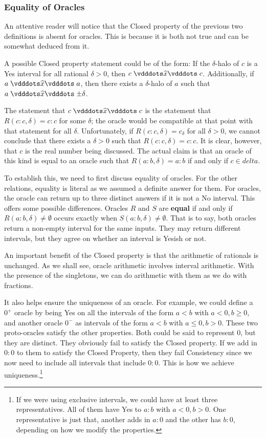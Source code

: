 \documentclass[12pt]{article}
\begin{document}
\subsubsection{Equality of Oracles}

An attentive reader will notice that the Closed property of the previous two definitions is absent for oracles. This is because it is both not true and can be somewhat deduced from it. 

A possible Closed property statement could be of the form: If the $\delta$-halo of $c$ is a Yes interval for all rational $\delta>0$, then $c \xora c$. Additionally, if \sout{$a \xora a$}, then there exists a $\delta$-halo of $a$ such that \sout{$a \xora \pm \delta$}.    

The statement that $c \xora c$ is the statement that $R(c:c, \delta)= c:c$ for some $\delta$; the oracle would be compatible at that point with that statement for all $\delta$. Unfortunately, if $R(c:c, \delta) = c_\delta$ for all $\delta > 0$, we cannot conclude that there exists a $\delta > 0$ such that $R(c:c, \delta) = c:c$. It is clear, however, that $c$ is the real number being discussed. The actual claim is that an oracle of this kind is equal to an oracle such that $R(a:b, \delta) = a:b$ if and only if $c \in delta$.

To establish this, we need to first discuss equality of oracles. For the other relations, equality is literal as we assumed a definite answer for them. For oracles, the oracle can return up to three distinct answers if it is not a No interval. This offers some possible differences. Oracles $R$ and $S$ are \textbf{equal} if and only if $R(a:b, \delta) \neq \emptyset$ occurs exactly when $S(a:b, \delta) \neq \emptyset$. That is to say, both oracles return a non-empty interval for the same inputs. They may return different intervals, but they agree on whether an interval is Yesish or not.  






 An important benefit of the Closed property is that the arithmetic of rationals is unchanged. As we shall see, oracle arithmetic involves interval arithmetic. With the presence of the singletons, we can do arithmetic with them as we do with fractions. 
    
    It also helps ensure the uniqueness of an oracle. For example, we could define a $0^+$ oracle by being Yes on all the intervals of the form $a \lt b$ with $a < 0, b \geq 0$, and another oracle $0^-$ as intervals of the form $a \lt b$ with $a \leq 0, b >0$. These two proto-oracles satisfy the other properties. Both could be said to represent $0$, but they are distinct. They obviously fail to satisfy the Closed property. If we add in $0:0$ to them to satisfy the Closed Property, then they fail Consistency since we now need to include all intervals that include $0:0$. This is how we achieve uniqueness.\footnote{If we were using exclusive intervals, we could have at least three representatives. All of them have Yes to $a:b$ with $a<0, b> 0$. One representative is just that, another adds in $a:0$ and the other has $b:0$, depending on how we modify the properties.} 
    
\end{document}
